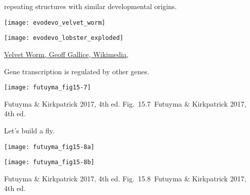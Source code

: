 \documentclass[t,handout]{beamer}  %
\newcommand{\futuyma}[1]{%
	\ifthenelse{\isempty{#1}}%
	{Futuyma \& Kirkpatrick 2017, 4th ed.}%
	{Fig.~#1~Futuyma \& Kirkpatrick 2017, 4th ed.}%
}
\newcommand{\backskip}{\vspace{-0.5\baselineskip}}
\begin{document}
\begin{frame}{ repeating structures with similar developmental origins.}

\vspace{-\baselineskip}

\begin{multicols}{2}

\centering

\texttt{[image: evodevo\_velvet\_worm]}

\columnbreak

\vspace*{-2\baselineskip}

\texttt{[image: evodevo\_lobster\_exploded]}

\end{multicols}

\vfilll

\tiny\href{https://commons.wikimedia.org/wiki/File:Velvet_worm.jpg}{Velvet Worm, Geoff Gallice, Wikimedia, }

	
\end{frame}


\begin{frame}{Gene transcription is regulated by other genes.}

\backskip


\centering

\texttt{[image: futuyma\_fig15-7]}

\tinyfill \futuyma{15.7}


\end{frame}


\begin{frame}{Let's build a fly.}

\backskip

\begin{multicols}{2}

\texttt{[image: futuyma\_fig15-8a]}

\columnbreak

\texttt{[image: futuyma\_fig15-8b]}

\end{multicols}

\tinyfill \futuyma{15.8}

\end{frame}
\end{document}
